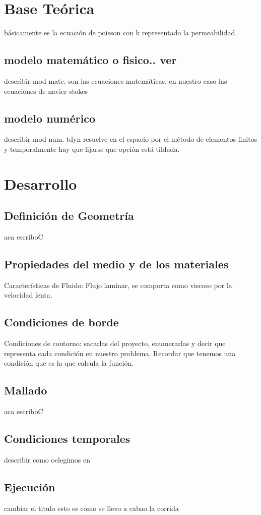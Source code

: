 \documentclass[10pt,a4paper,final]{article}
\begin{document}
\section{Base Teórica}
básicamente es la ecuación de poisson con k
representado la permeabilidad.
\subsection{modelo matemático o fisico.. ver}
describir mod mate.
 son las ecuaciones matemáticas, en nuestro caso las
ecuaciones de navier stokes
%
\subsection{modelo numérico}
describir mod num.
tdyn resuelve en el espacio por el método de
elementos finitos y temporalmente hay que fijarse que opción está
tildada.
\section{Desarrollo}
%
\subsection{Definición de Geometría}
aca escriboC
%
\subsection{Propiedades del medio y de los materiales}
Características de Fluido: Flujo laminar, se comporta como viscoso por
la velocidad lenta.

%
\subsection{Condiciones de borde}
Condiciones de contorno: sacarlas del proyecto, enumerarlas y decir
que representa cada condición en nuestro problema. Recordar que
tenemos una condición que es la que calcula la función.
%
\subsection{Mallado}
aca escriboC
%
\subsection{Condiciones temporales}
describir como oelegimos en
%
%
\subsection{Ejecución}
cambiar el titulo esto es como se llevo a cabao la corrida
\end{document}
